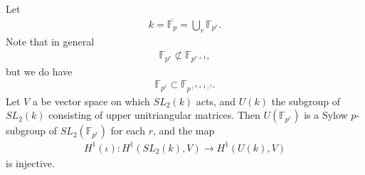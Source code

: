 \begin{example}
	Let
	\begin{align}
		k = \overline{\mathbb{F}_p} = \bigcup_r \mathbb{F}_{p^r}.
	\end{align}
	Note that in general
	\begin{align}
	  \mathbb{F}_{p^r} \not\subset \mathbb{F}_{p^{r+1}},
	\end{align}
	but we do have
	\begin{align}
	  \mathbb{F}_{p^r} \subset \mathbb{F}_{p^{(r + 1)!}}.
	\end{align}
	Let $V$ a be vector space on which $SL_2(k)$ acts, and $U(k)$ the subgroup of $SL_2(k)$ consisting of upper unitriangular matrices. Then $U(\mathbb{F}_{p^r})$ is a Sylow $p$-subgroup of $SL_2(\mathbb{F}_{p^r})$ for each $r$, and the map
	\begin{align}
		H^1(\iota): H^1(SL_2(k), V) \rightarrow H^1(U(k), V)
	\end{align}
	is injective.
\label{eg:sl2ab}
\end{example}
